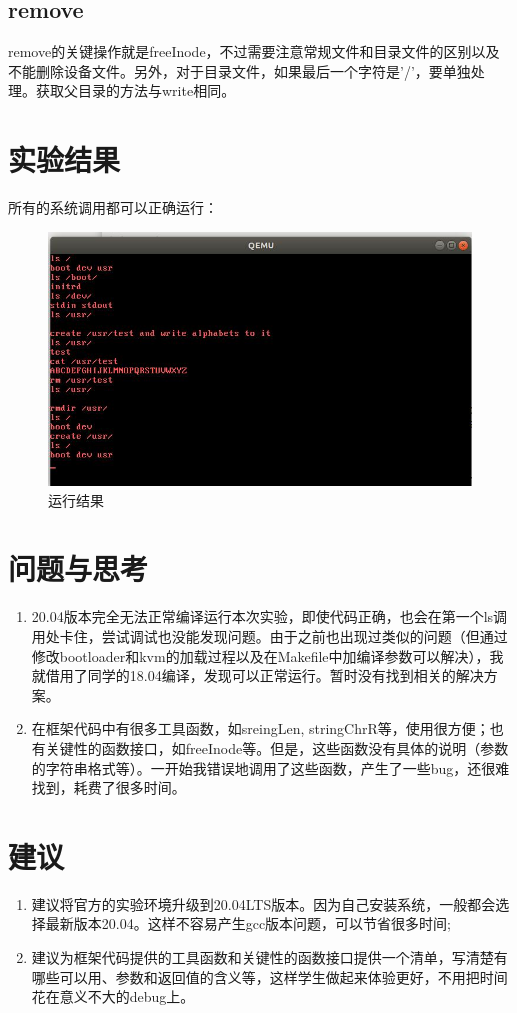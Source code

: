 \documentclass[12pt,a4paper,UTF8]{article}
\begin{document}
\subsection{remove}
remove的关键操作就是freeInode，不过需要注意常规文件和目录文件的区别以及不能删除设备文件。另外，对于目录文件，如果最后一个字符是'/'，要单独处理。获取父目录的方法与write相同。


\section{实验结果}
所有的系统调用都可以正确运行：
\begin{figure}[htbp]
	\centering
	\includegraphics[width=\textwidth]{result}
	\caption{运行结果}
\end{figure}

\section{问题与思考}
\begin{enumerate}
	\item 20.04版本完全无法正常编译运行本次实验，即使代码正确，也会在第一个ls调用处卡住，尝试调试也没能发现问题。由于之前也出现过类似的问题（但通过修改bootloader和kvm的加载过程以及在Makefile中加编译参数可以解决），我就借用了同学的18.04编译，发现可以正常运行。暂时没有找到相关的解决方案。
	\item 在框架代码中有很多工具函数，如sreingLen, stringChrR等，使用很方便；也有关键性的函数接口，如freeInode等。但是，这些函数没有具体的说明（参数的字符串格式等）。一开始我错误地调用了这些函数，产生了一些bug，还很难找到，耗费了很多时间。
\end{enumerate}

\section{建议}
\begin{enumerate}
	\item 建议将官方的实验环境升级到20.04LTS版本。因为自己安装系统，一般都会选择最新版本20.04。这样不容易产生gcc版本问题，可以节省很多时间;
	\item 建议为框架代码提供的工具函数和关键性的函数接口提供一个清单，写清楚有哪些可以用、参数和返回值的含义等，这样学生做起来体验更好，不用把时间花在意义不大的debug上。
\end{enumerate}
\end{document}
